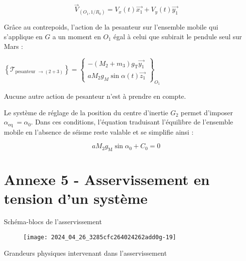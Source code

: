 $$
\vec{V}_{\left(O_{1}, 1 / R_{0}\right)}=V_{x}(t) \overrightarrow{x_{1}}+V_{y}(t) \overrightarrow{y_{1}}
$$

Grâce au contrepoids, l'action de la pesanteur sur l'ensemble mobile qui s'applique en $G$ a un moment en $O_{1}$ égal à celui que subirait le pendule seul sur Mars :

$\left\{\mathcal{T}_{\text {pesanteur } \rightarrow(2+3)}\right\}=\left\{\begin{array}{c}-\left(M_{2}+m_{3}\right) g_{\mathrm{T}} \overrightarrow{y_{1}} \\ a M_{2} g_{M} \sin \alpha(t) \overrightarrow{z_{1}}\end{array}\right\}_{O_{1}}$

Aucune autre action de pesanteur n'est à prendre en compte.

Le système de réglage de la position du centre d'inertie $G_{2}$ permet d'imposer $\alpha_{\text {eq }}=\alpha_{0}$. Dans ces conditions, l'équation traduisant l'équilibre de l'ensemble mobile en l'absence de séisme reste valable et se simplifie ainsi :


\begin{equation*}
a M_{2} g_{\mathrm{M}} \sin \alpha_{0}+C_{0}=0 \tag{eq.1'}
\end{equation*}


\section*{Annexe 5 - Asservissement en tension d'un système}
Schéma-blocs de l'asservissement

\begin{figure}[!h]
\centering
\texttt{[image: 2024\_04\_26\_3285cfc264024262add0g-19]}
\end{figure}

Grandeurs physiques intervenant dans l'asservissement

